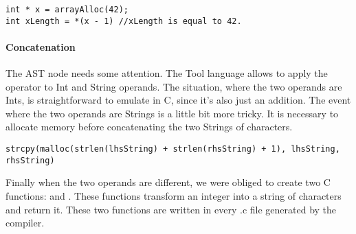 \begin{lstlisting}
int * x = arrayAlloc(42);
int xLength = *(x - 1) //xLength is equal to 42.
\end{lstlisting}

\paragraph{Concatenation}
The AST node  needs some attention.
The Tool language allows to apply the \say{+} operator to Int and String operands.
\newline
The situation, where the two operands are Ints, is straightforward to emulate in C, since
it's also just an addition.
\newline
The event where the two operands are Strings is a little bit more tricky.
It is necessary to allocate memory before concatenating the two Strings of characters.
\begin{lstlisting}
strcpy(malloc(strlen(lhsString) + strlen(rhsString) + 1), lhsString, rhsString)
\end{lstlisting}
Finally when the two operands are different, we were obliged to create two C functions:
\newline
\lstset{style=customc}{\lstinline[basicstyle=\small\ttfamily]|void helper_reverse_plus(char str[], int len)|} and
\lstset{style=customc}{\lstinline[basicstyle=\small\ttfamily]|char* itoa(int num)|}.
These functions transform an integer into a string of characters and return it.
\newline
These two functions are written in every .c file generated by the compiler.

